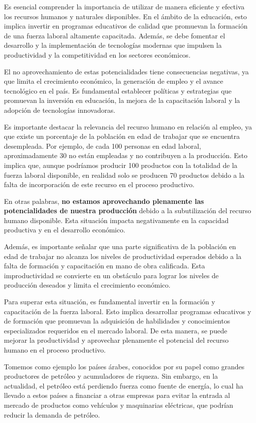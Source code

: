 \documentclass[
  jou,
  floatsintext,
  longtable,
  a4paper,
  nolmodern,
  notxfonts,
  notimes,
  12pt,
  colorlinks=true,linkcolor=blue,citecolor=blue,urlcolor=blue]{apa7}
\begin{document}
Es esencial comprender la importancia de utilizar de manera eficiente y
efectiva los recursos humanos y naturales disponibles. En el ámbito de
la educación, esto implica invertir en programas educativos de calidad
que promuevan la formación de una fuerza laboral altamente capacitada.
Además, se debe fomentar el desarrollo y la implementación de
tecnologías modernas que impulsen la productividad y la competitividad
en los sectores económicos.

El no aprovechamiento de estas potencialidades tiene consecuencias
negativas, ya que limita el crecimiento económico, la generación de
empleo y el avance tecnológico en el país. Es fundamental establecer
políticas y estrategias que promuevan la inversión en educación, la
mejora de la capacitación laboral y la adopción de tecnologías
innovadoras.

Es importante destacar la relevancia del recurso humano en relación al
empleo, ya que existe un porcentaje de la población en edad de trabajar
que se encuentra desempleada. Por ejemplo, de cada 100 personas en edad
laboral, aproximadamente 30 no están empleadas y no contribuyen a la
producción. Esto implica que, aunque podríamos producir 100 productos
con la totalidad de la fuerza laboral disponible, en realidad solo se
producen 70 productos debido a la falta de incorporación de este recurso
en el proceso productivo.

En otras palabras, \textbf{no estamos aprovechando plenamente las
potencialidades de nuestra producción} debido a la subutilización del
recurso humano disponible. Esta situación impacta negativamente en la
capacidad productiva y en el desarrollo económico.

Además, es importante señalar que una parte significativa de la
población en edad de trabajar no alcanza los niveles de productividad
esperados debido a la falta de formación y capacitación en mano de obra
calificada. Esta improductividad se convierte en un obstáculo para
lograr los niveles de producción deseados y limita el crecimiento
económico.

Para superar esta situación, es fundamental invertir en la formación y
capacitación de la fuerza laboral. Esto implica desarrollar programas
educativos y de formación que promuevan la adquisición de habilidades y
conocimientos especializados requeridos en el mercado laboral. De esta
manera, se puede mejorar la productividad y aprovechar plenamente el
potencial del recurso humano en el proceso productivo.

Tomemos como ejemplo los países árabes, conocidos por su papel como
grandes productores de petróleo y acumuladores de riqueza. Sin embargo,
en la actualidad, el petróleo está perdiendo fuerza como fuente de
energía, lo cual ha llevado a estos países a financiar a otras empresas
para evitar la entrada al mercado de productos como vehículos y
maquinarias eléctricas, que podrían reducir la demanda de petróleo.
\end{document}
